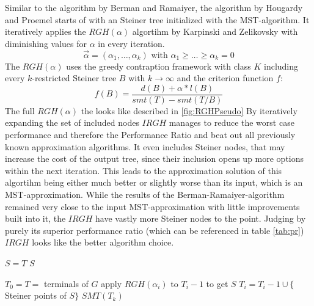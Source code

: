 Similar to the algorithm by Berman and Ramaiyer, the algorithm by Hougardy and Proemel \cite{HoPr99} starts of with an Steiner tree initialized with the MST-algorithm. It iteratively applies the $RGH(\alpha)$ algortihm by Karpinski and Zelikovsky \cite{karpinski1997new} with diminishing values for $\alpha$ in every iteration.$$\vec{\alpha}=(\alpha_1,\dots,\alpha_k) \text{ with } \alpha_1 \geq \dots \geq \alpha_k=0$$ 
The $RGH(\alpha)$ uses the greedy contraption framework \cite{karpinski1997new} with class $K$ including every $k$-restricted Steiner tree $B$ with $k\to\infty$ and the criterion function $f$: $$ f(B) = \frac{d(B) + \alpha * l(B)}{smt(T)-smt(T/B)} $$
The full $RGH(\alpha)$ the looks like described in \ref{fig:RGHPseudo}
By iteratively expanding the set of included nodes $IRGH$ manages to reduce the worst case performance and therefore the Performance Ratio and beat out all previously known approximation algorithms. It even includes Steiner nodes, that may increase the cost of the output tree, since their inclusion opens up more options within the next iteration. This leads to the approximation solution of this algortihm being either much better or slightly worse than its input, which is an MST-approximation.  While the results of the Berman-Ramaiyer-algorithm remained very close to the input MST-approximation with little improvements built into it, the $IRGH$ have vastly more Steiner nodes to the point. Judging by purely its superior performance ratio (which can be referenced in table \ref{tab:pr}) $IRGH$ looks like the better algorithm choice. 

\begin{algorithm}[hb]
$S=T$\;
 {
}
\KwRet $S$\;

\label{fig:RGHPseudo}
\end{algorithm}


\begin{algorithm}[hb]
$T_0=T=$ terminals of $G$\;
 {
	apply $RGH(\alpha_i)$ to $T_i-1$ to get $S$\;
	$T_i=T_i-1 \cup \{$Steiner points of $S\}$\;
}
\KwRet $SMT(T_k)$\;
\label{fig:IRGHPseudo}
\end{algorithm}
